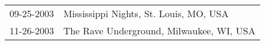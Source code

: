 \begin{supertabular}{ll}
 09-25-2003 &    Mississippi Nights, St. Louis, MO, USA \\
 11-26-2003 &  The Rave Underground, Milwaukee, WI, USA \\
\end{supertabular}

